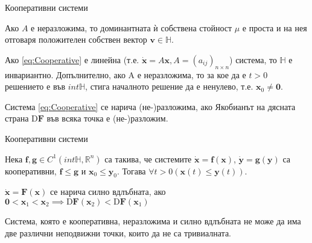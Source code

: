 \begin{frame}[t]{Кооперативни системи}
  \begin{theorem}
    Ако $A$ е неразложима, то доминантната ѝ собствена стойност $\mu$ е проста и на нея отговаря положителен собствен вектор $\mathbf{v} \in \mathbb{H}$.
  \end{theorem}

  \begin{theorem}
    Ако \ref{eq:Cooperative} е линейна (т.е. $\dot{\mathbf{x}} = A \mathbf{x}, A = (a_{ij})_{n \times n}$) система, то $\mathbb{H}$ е инвариантно. Допълнително, ако A е неразложима, то за кое да е $t > 0$ решението е във $int \mathbb{H}$, стига началното решение да е ненулево, т.е. $\mathbf{x}_0 \neq \mathbf{0}$.
  \end{theorem}

  \begin{definition}
    Система \ref{eq:Cooperative} се нарича (не-)разложима, ако Якобианът на дясната страна $\mathrm{D}\mathbf{F}$ във всяка точка е (не-)разложим.
  \end{definition}
\end{frame}

\begin{frame}[t]{Кооперативни системи}
  \begin{theorem}
    \label{thm:Comparison}
    Нека $\mathbf{f}, \mathbf{g} \in C^1(int \mathbb{H}, \mathbb{R}^n)$ са такива, че системите $\dot{\mathbf{x}}=\mathbf{f}(\mathbf{x})$, $\dot{\mathbf{y}}=\mathbf{g}(\mathbf{y})$ са кооперативни, $\mathbf{f} \leq \mathbf{g}$ и $\mathbf{x}_0 \leq \mathbf{y}_0$. Тогава $\forall{t>0}(\mathbf{x}(t) \leq \mathbf{y}(t))$.
  \end{theorem}

  \begin{definition}
    $\dot{\mathbf{x}} = \mathbf{F}(\mathbf{x})$ се нарича силно вдлъбната, ако $\mathbf{0} < \mathbf{x}_1 < \mathbf{x}_2 \implies \mathrm{D}\mathbf{F}(\mathbf{x}_2) < \mathrm{D}\mathbf{F}(\mathbf{x}_1)$
  \end{definition}

  \begin{theorem}
    Система, която е кооперативна, неразложима и силно вдлъбната не може да има две различни неподвижни точки, които да не са тривиалната.
  \end{theorem}
\end{frame}

